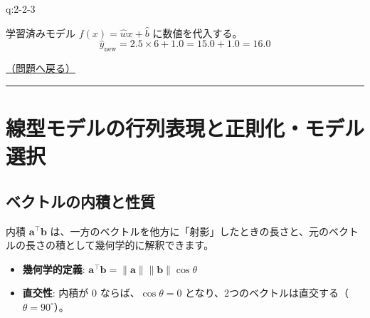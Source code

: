 \begin{answerbox}[phantomlabel=a:2-2-3]{q:2-2-3}

学習済みモデル \(f(x) = \hat{w}x + \hat{b}\) に数値を代入する。 \[
\hat{y}_{\text{new}} = 2.5 \times 6 + 1.0 = 15.0 + 1.0 = 16.0
\]

\hfill 

\hyperref[q:2-2-3]{（問題へ戻る）}

\begin{center}\rule{0.5\linewidth}{0.5pt}\end{center}

\end{answerbox}

\section{線型モデルの行列表現と正則化・モデル選択}\label{ux7ddaux578bux30e2ux30c7ux30ebux306eux884cux5217ux8868ux73feux3068ux6b63ux5247ux5316ux30e2ux30c7ux30ebux9078ux629e}

\subsection{ベクトルの内積と性質}\label{ux30d9ux30afux30c8ux30ebux306eux5185ux7a4dux3068ux6027ux8cea}

\begin{tcolorbox}[enhanced, colback=blue!2!white, colframe=blue!60!black, fonttitle=\bfseries, drop shadow, title={【復習とヒント】ベクトルの内積と射影}]

内積 \(\mathbf{a}^\top \mathbf{b}\)
は、一方のベクトルを他方に「射影」したときの長さと、元のベクトルの長さの積として幾何学的に解釈できます。

\begin{center}
\end{center}

\begin{itemize}
\tightlist
\item
  \textbf{幾何学的定義}:
  \(\mathbf{a}^\top \mathbf{b} = \|\mathbf{a}\| \|\mathbf{b}\| \cos \theta\)
\item
  \textbf{直交性}: 内積が \(0\) ならば、\(\cos \theta = 0\)
  となり、2つのベクトルは直交する（\(\theta = 90^\circ\)）。
\end{itemize}

\end{tcolorbox}


